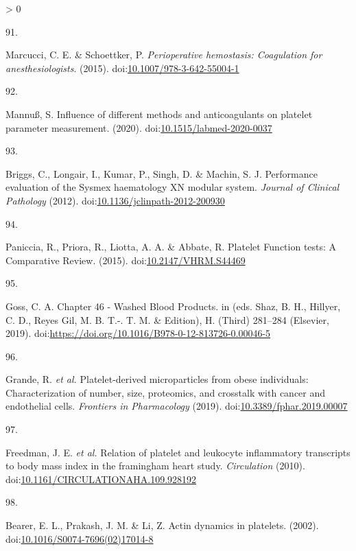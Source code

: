 \documentclass[11pt,twoside]{bristolthesis}
\newlength{\cslhangindent}
\newlength{\csllabelwidth}
\newenvironment{CSLReferences}[2] %
 {%
  \setlength{\parindent}{0pt}
  \ifodd #1 \everypar{\setlength{\hangindent}{\cslhangindent}}\ignorespaces\fi
  \ifnum #2 > 0
  \setlength{\parskip}{#2\baselineskip}
  \fi
 }%
 {}
\newcommand{\CSLLeftMargin}[1]{\parbox[t]{\csllabelwidth}{#1}}
\newcommand{\CSLRightInline}[1]{\parbox[t]{\linewidth - \csllabelwidth}{#1}\break}
\begin{document}
\begin{CSLReferences}{0}{0}
\leavevmode\hypertarget{ref-Marcucci2015}{}%
\CSLLeftMargin{91. }
\CSLRightInline{Marcucci, C. E. \& Schoettker, P. \emph{{Perioperative hemostasis: Coagulation for anesthesiologists}}. (2015). doi:\href{https://doi.org/10.1007/978-3-642-55004-1}{10.1007/978-3-642-55004-1}}

\leavevmode\hypertarget{ref-Mannuuxdf2020}{}%
\CSLLeftMargin{92. }
\CSLRightInline{Mannuß, S. {Influence of different methods and anticoagulants on platelet parameter measurement}. (2020). doi:\href{https://doi.org/10.1515/labmed-2020-0037}{10.1515/labmed-2020-0037}}

\leavevmode\hypertarget{ref-Briggs2012}{}%
\CSLLeftMargin{93. }
\CSLRightInline{Briggs, C., Longair, I., Kumar, P., Singh, D. \& Machin, S. J. {Performance evaluation of the Sysmex haematology XN modular system}. \emph{Journal of Clinical Pathology} (2012). doi:\href{https://doi.org/10.1136/jclinpath-2012-200930}{10.1136/jclinpath-2012-200930}}

\leavevmode\hypertarget{ref-Paniccia2015}{}%
\CSLLeftMargin{94. }
\CSLRightInline{Paniccia, R., Priora, R., Liotta, A. A. \& Abbate, R. {Platelet Function tests: A Comparative Review}. (2015). doi:\href{https://doi.org/10.2147/VHRM.S44469}{10.2147/VHRM.S44469}}

\leavevmode\hypertarget{ref-Goss2019}{}%
\CSLLeftMargin{95. }
\CSLRightInline{Goss, C. A. {Chapter 46 - Washed Blood Products}. in (eds. Shaz, B. H., Hillyer, C. D., Reyes Gil, M. B. T.-. T. M. \& Edition), H. (Third) 281--284 (Elsevier, 2019). doi:\url{https://doi.org/10.1016/B978-0-12-813726-0.00046-5}}

\leavevmode\hypertarget{ref-Grande2019}{}%
\CSLLeftMargin{96. }
\CSLRightInline{Grande, R. \emph{et al.} {Platelet-derived microparticles from obese individuals: Characterization of number, size, proteomics, and crosstalk with cancer and endothelial cells}. \emph{Frontiers in Pharmacology} (2019). doi:\href{https://doi.org/10.3389/fphar.2019.00007}{10.3389/fphar.2019.00007}}

\leavevmode\hypertarget{ref-Freedman2010}{}%
\CSLLeftMargin{97. }
\CSLRightInline{Freedman, J. E. \emph{et al.} {Relation of platelet and leukocyte inflammatory transcripts to body mass index in the framingham heart study}. \emph{Circulation} (2010). doi:\href{https://doi.org/10.1161/CIRCULATIONAHA.109.928192}{10.1161/CIRCULATIONAHA.109.928192}}

\leavevmode\hypertarget{ref-Bearer2002}{}%
\CSLLeftMargin{98. }
\CSLRightInline{Bearer, E. L., Prakash, J. M. \& Li, Z. {Actin dynamics in platelets}. (2002). doi:\href{https://doi.org/10.1016/S0074-7696(02)17014-8}{10.1016/S0074-7696(02)17014-8}}


\end{CSLReferences}
\end{document}

